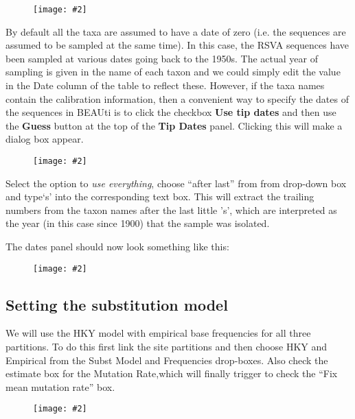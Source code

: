 \documentclass[12pt]{article}
\newcommand{\includeimage}[2][]{%
\texttt{[image: \#2]}
}
\begin{document}
\begin{figure}
\centering	
\includeimage[scale=0.4,clip=true,trim=0 0 0 0]{figures/BEAUti_partition}
\label{fig:BEAUti_partition}
\end{figure}

By default all the taxa are assumed to have a date of zero (i.e. the sequences are assumed to be sampled at the same time).
In this case, the RSVA sequences have been sampled at various dates going back to the 1950s. The actual year of sampling
is given in the name of each taxon and we could simply edit the value in the Date column of the table to reflect these.
However, if the taxa names contain the calibration information, then a convenient way to specify the dates of the sequences
in BEAUti is to click the checkbox {\bf Use tip dates} and then use the {\bf Guess} button at the top of the {\bf Tip Dates} panel. Clicking this will make a dialog box appear.

\begin{figure}
\centering	
\includeimage[width=0.6\textwidth]{figures/BEAUti_GuessDates}
\label{fig:BEAUti_GuessDates}
\end{figure}


Select the option to {\it use everything}, choose ``after last'' from from drop-down box and type`s' into the corresponding text box. This will extract the trailing numbers from the taxon names after the last little 's', which are interpreted as the year (in this case since 1900) that the sample was isolated.

The dates panel should now look something like this:

\begin{figure}
\centering	
\includeimage[scale=0.4,clip=true,trim=0 0 0 0]{figures/BEAUti_dates}
\label{fig:BEAUti_dates}
\end{figure}


\subsection*{Setting the substitution model}
We will use the HKY model with empirical base frequencies for all three partitions. To do this first link the site partitions and then choose HKY and Empirical from the Subst Model and Frequencies drop-boxes. Also check the estimate box for the Mutation Rate,which will finally trigger to check the ``Fix mean mutation rate'' box. 

\begin{figure}
\centering	
\includeimage[width=\textwidth]{figures/BEAUti_Site_Model}
\label{fig:BEAUti_Site_Model}
\end{figure}
\end{document}

